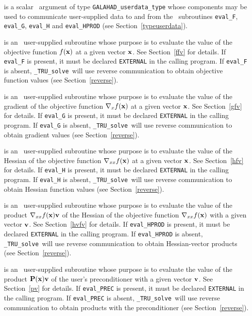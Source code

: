 \documentclass{galahad}
\newcommand{\packagename}{TRU}
\newcommand{\fullpackagename}{\libraryname\_\packagename}
\newcommand{\solver}{{\tt \fullpackagename\_solve}}
\begin{document}
\begin{description}
 is a scalar \intentinout\ argument of type
{\tt GALAHAD\_userdata\_type} whose components may be used
to communicate user-supplied data to and from the
\optional\ subroutines
{\tt eval\_F}, {\tt eval\_G},
{\tt eval\_H} and {\tt eval\_HPROD}
(see Section~\ref{typeuserdata}).

 is an \optional\
user-supplied subroutine whose purpose is to evaluate the value of the
objective function $f({\mathbf{x}})$ at a given vector ${\mathbf{x}}$.
See Section~\ref{ffv} for details.
If {\tt eval\_F} is present,
it must be declared {\tt EXTERNAL} in the calling program.
If {\tt eval\_F} is absent, \solver\ will use reverse communication to
obtain objective function values (see Section~\ref{reverse}).

 is an \optional\
user-supplied subroutine whose purpose is to evaluate the value of the
gradient of the objective function $\nabla_x f({\mathbf{x}})$ at a given vector ${\mathbf{x}}$.
See Section~\ref{gfv} for details.
If {\tt eval\_G} is present,
it must be declared {\tt EXTERNAL} in the calling program.
If {\tt eval\_G} is absent, \solver\ will use reverse communication to
obtain gradient values (see Section~\ref{reverse}).

 is an \optional\
user-supplied subroutine whose purpose is to evaluate the value of the
Hessian of the objective function $\nabla_{xx} f({\mathbf{x}})$ at a given vector ${\mathbf{x}}$.
See Section~\ref{hfv} for details.
If {\tt eval\_H} is present,
it must be declared {\tt EXTERNAL} in the calling program.
If {\tt eval\_H} is absent, \solver\ will use reverse communication to
obtain Hessian function values (see Section~\ref{reverse}).

\itt{eval\_HPROD} is an \optional\
user-supplied subroutine whose purpose is to evaluate the value of the
product $\nabla_{xx} f({\mathbf{x}}){\mathbf{v}}$ of the Hessian of the objective function
$\nabla_{xx} f({\mathbf{x}})$  with a given vector ${\mathbf{v}}$.
See Section~\ref{hvfv} for details.
If {\tt eval\_HPROD} is present,
it must be declared {\tt EXTERNAL} in the calling program.
If {\tt eval\_HPROD} is absent, \solver\ will use reverse communication to
obtain Hessian-vector products (see Section~\ref{reverse}).

\itt{eval\_PREC} is an \optional\
user-supplied subroutine whose purpose is to evaluate the value of the
product ${\mathbf{P}}({\mathbf{x}}){\mathbf{v}}$ of the user's preconditioner with a given vector
${\mathbf{v}}$. See Section~\ref{pv} for details.
If {\tt eval\_PREC} is present,
it must be declared {\tt EXTERNAL} in the calling program.
If {\tt eval\_PREC} is absent, \solver\ will use reverse communication to
obtain products with the preconditioner (see Section~\ref{reverse}).

\end{description}
\end{document}
